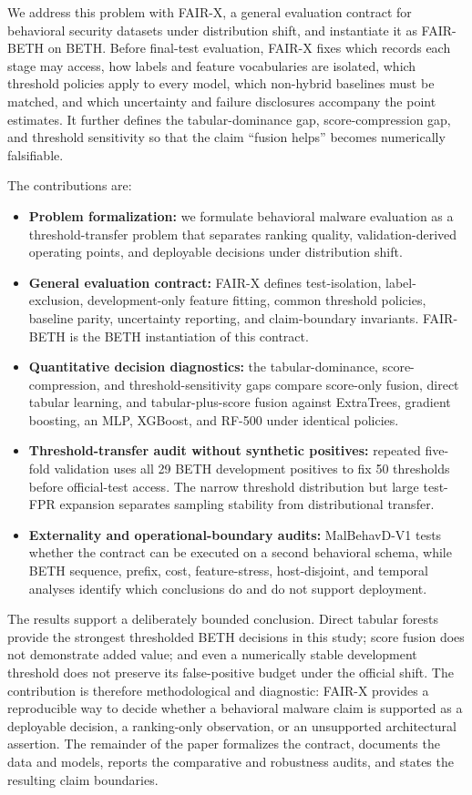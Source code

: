 \documentclass[10pt,journal,compsoc]{IEEEtran}
\begin{document}
We address this problem with FAIR-X, a general evaluation contract for behavioral security datasets under distribution shift, and instantiate it as FAIR-BETH on BETH. Before final-test evaluation, FAIR-X fixes which records each stage may access, how labels and feature vocabularies are isolated, which threshold policies apply to every model, which non-hybrid baselines must be matched, and which uncertainty and failure disclosures accompany the point estimates. It further defines the tabular-dominance gap, score-compression gap, and threshold sensitivity so that the claim ``fusion helps'' becomes numerically falsifiable.

The contributions are:
\begin{itemize}
    \item \textbf{Problem formalization:} we formulate behavioral malware evaluation as a threshold-transfer problem that separates ranking quality, validation-derived operating points, and deployable decisions under distribution shift.
    \item \textbf{General evaluation contract:} FAIR-X defines test-isolation, label-exclusion, development-only feature fitting, common threshold policies, baseline parity, uncertainty reporting, and claim-boundary invariants. FAIR-BETH is the BETH instantiation of this contract.
    \item \textbf{Quantitative decision diagnostics:} the tabular-dominance, score-compression, and threshold-sensitivity gaps compare score-only fusion, direct tabular learning, and tabular-plus-score fusion against ExtraTrees, gradient boosting, an MLP, XGBoost, and RF-500 under identical policies.
    \item \textbf{Threshold-transfer audit without synthetic positives:} repeated five-fold validation uses all 29 BETH development positives to fix 50 thresholds before official-test access. The narrow threshold distribution but large test-FPR expansion separates sampling stability from distributional transfer.
    \item \textbf{Externality and operational-boundary audits:} MalBehavD-V1 tests whether the contract can be executed on a second behavioral schema, while BETH sequence, prefix, cost, feature-stress, host-disjoint, and temporal analyses identify which conclusions do and do not support deployment.
\end{itemize}

The results support a deliberately bounded conclusion. Direct tabular forests provide the strongest thresholded BETH decisions in this study; score fusion does not demonstrate added value; and even a numerically stable development threshold does not preserve its false-positive budget under the official shift. The contribution is therefore methodological and diagnostic: FAIR-X provides a reproducible way to decide whether a behavioral malware claim is supported as a deployable decision, a ranking-only observation, or an unsupported architectural assertion. The remainder of the paper formalizes the contract, documents the data and models, reports the comparative and robustness audits, and states the resulting claim boundaries.
\end{document}
